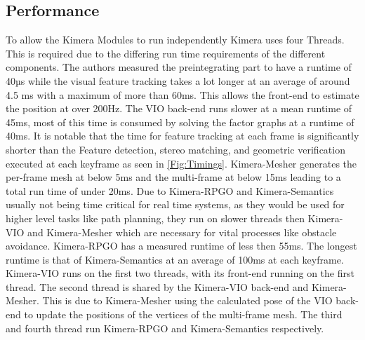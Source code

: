 \documentclass[11pt,a4paper]{article}
\begin{document}
\subsection{Performance}
To allow the Kimera Modules to run independently Kimera uses four Threads. 
This is required due to the differing run time requirements of the different components.
The authors measured the preintegrating part to have a runtime of 40µs while the visual feature tracking takes a lot longer at an average of around 4.5 ms with a maximum of more than 60ms.
This allows the front-end to estimate the position at over 200Hz.
The VIO back-end runs slower at a mean runtime of 45ms, most of this time is consumed by solving the factor graphs at a runtime of 40ms. 
It is notable that the time for feature tracking at each frame is significantly shorter than the Feature detection, stereo matching,
and geometric verification executed at each keyframe as seen in \ref{Fig:Timings}.
Kimera-Mesher generates the per-frame mesh at below 5ms and the multi-frame at below 15ms leading to a total run time of under 20ms.
Due to Kimera-RPGO and Kimera-Semantics usually not being time critical for real time systems, as they would be used for higher level tasks like path planning, they run on slower threads then Kimera-VIO and Kimera-Mesher which are necessary for vital processes like obstacle avoidance.
Kimera-RPGO has a measured runtime of less then 55ms.
The longest runtime is that of Kimera-Semantics at an average of 100ms at each keyframe. 
Kimera-VIO runs on the first two threads, with its front-end running on the first thread.
The second thread is shared by the Kimera-VIO back-end and Kimera-Mesher.
This is due to Kimera-Mesher using the calculated pose of the VIO back-end to update the positions of the vertices of the multi-frame mesh.
The third and fourth thread run Kimera-RPGO and Kimera-Semantics respectively. 
\end{document}
